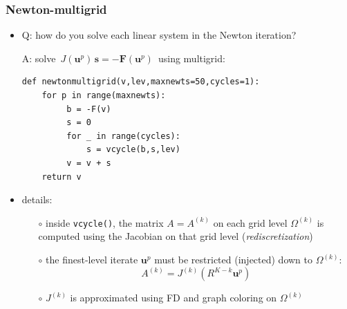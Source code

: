 \documentclass[10pt,
               svgnames,
               hyperref={colorlinks,citecolor=DeepPink4,linkcolor=FireBrick,urlcolor=Maroon},
               usepdftitle=false]{beamer}
\newcommand{\bs}{\mathbf{s}}
\newcommand{\bu}{\mathbf{u}}
\newcommand{\bF}{\mathbf{F}}
\begin{document}
\begin{frame}[fragile]
\frametitle{Newton-multigrid}

\begin{itemize}
\item Q: how do you solve each linear system in the Newton iteration?

\medskip
A: solve \,$J(\bu^{p})\, \bs = - \bF(\bu^p)$ \,\alert{using multigrid}:

\medskip
\begin{verbatim}
def newtonmultigrid(v,lev,maxnewts=50,cycles=1):
    for p in range(maxnewts):
         b = -F(v)
         s = 0
         for _ in range(cycles):
             s = vcycle(b,s,lev)
         v = v + s
    return v
\end{verbatim}

\medskip
\item<2> details:
	\begin{itemize}
	\item[$\circ$] inside \texttt{vcycle()}, the matrix $A=A^{(k)}$ on each grid level $\Omega^{(k)}$ is computed using the Jacobian on that grid level (\emph{rediscretization})
	\item[$\circ$] the finest-level iterate $\bu^p$ must be restricted (injected) down to $\Omega^{(k)}$:
	    $$A^{(k)}=J^{(k)}(R^{K-k} \bu^p)$$
	\item[$\circ$] $J^{(k)}$ is approximated using FD and graph coloring on $\Omega^{(k)}$
	\end{itemize}
\end{itemize}
\end{frame}
\end{document}
